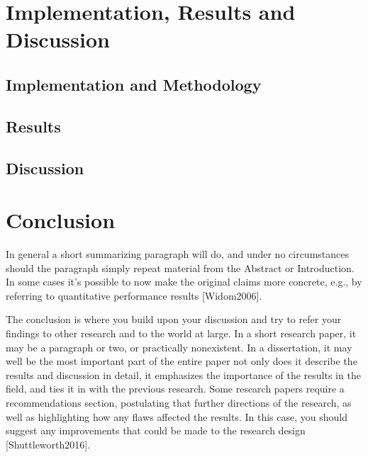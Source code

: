 \documentclass[letterpaper,10pt,english]{sphinxmanual}
\begin{document}
\sphinxstepscope


\section{Implementation, Results and Discussion}
\label{\detokenize{docs/ShavitFrancezAlg/results:implementation-results-and-discussion}}\label{\detokenize{docs/ShavitFrancezAlg/results::doc}}

\subsection{Implementation and Methodology}
\label{\detokenize{docs/ShavitFrancezAlg/results:implementation-and-methodology}}

\subsection{Results}
\label{\detokenize{docs/ShavitFrancezAlg/results:results}}

\subsection{Discussion}
\label{\detokenize{docs/ShavitFrancezAlg/results:discussion}}
\sphinxstepscope


\section{Conclusion}
\label{\detokenize{docs/ShavitFrancezAlg/conclusion:conclusion}}\label{\detokenize{docs/ShavitFrancezAlg/conclusion::doc}}
\sphinxAtStartPar
In general a short summarizing paragraph will do, and under no circumstances should the paragraph simply repeat material from the Abstract or Introduction. In some cases it’s possible to now make the original claims more concrete, e.g., by referring to quantitative performance results {[}Widom2006{]}.

\sphinxAtStartPar
The conclusion is where you build upon your discussion and try to refer your findings to other research and to the world at large. In a short research paper, it may be a paragraph or two, or practically non\sphinxhyphen{}existent. In a dissertation, it may well be the most important part of the entire paper \sphinxhyphen{} not only does it describe the results and discussion in detail, it emphasizes the importance of the results in the field, and ties it in with the previous research. Some research papers require a recommendations section, postulating that further directions of the research, as well as highlighting how any flaws affected the results. In this case, you should suggest any improvements that could be made to the research design {[}Shuttleworth2016{]}.
\end{document}
